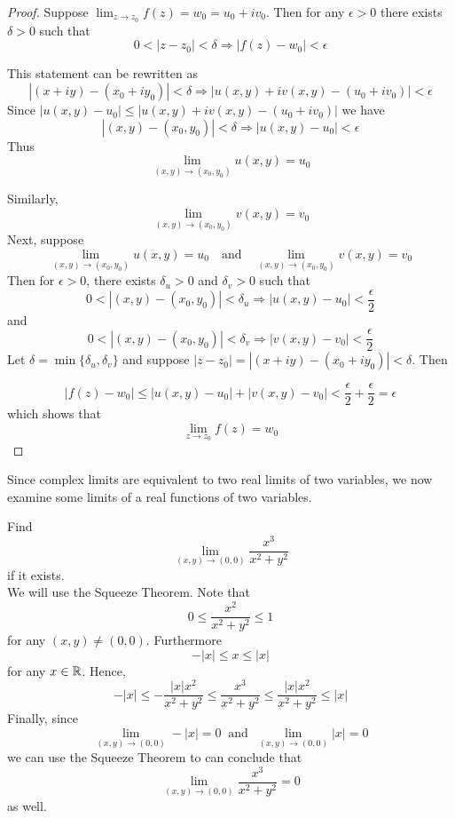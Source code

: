 \documentclass[handout]{ximera}
\begin{document}
\begin{proof} %
Suppose $\lim_{z \to z_0} f(z) = w_0 = u_0 + iv_0$.
Then for any $\epsilon > 0$ there exists $\delta > 0$ such that
\[
0< |z-z_0| < \delta \Rightarrow |f(z) - w_0| < \epsilon
\]


This statement can be rewritten as
\[
|(x+iy)-(x_0+i y_0)| < \delta \Rightarrow |u(x,y) + iv(x,y) - (u_0 + iv_0)|< \epsilon
\]
Since $|u(x,y) - u_0| \leq |u(x,y) + iv(x,y) - (u_0 + iv_0)|$
we have
\[
|(x,y)-(x_0, y_0)| < \delta \Rightarrow |u(x,y)  - u_0 |< \epsilon
\]
Thus
\[
\lim_{(x,y) \to (x_0, y_0)} u(x,y) =  u_0 
\]
 


Similarly,
\[
\lim_{(x,y) \to (x_0, y_0)} v(x,y) =  v_0 
\]
Next, suppose
\[
\lim_{(x,y) \to (x_0, y_0)} u(x,y) =  u_0  \quad \mbox{and} \quad \lim_{(x,y) \to (x_0, y_0)} v(x,y) =  v_0 
\]
Then for $\epsilon > 0$, there exists $\delta_u > 0$ and $\delta_v > 0$ such that
\[
0<|(x,y)-(x_0, y_0)| < \delta_u \Rightarrow |u(x,y)  - u_0 |< \frac{\epsilon}{2}
\]
and
\[
0<|(x,y)-(x_0, y_0)| < \delta_v \Rightarrow |v(x,y)  - v_0 |< \frac{\epsilon}{2}
\]
Let $\delta = \min\{\delta_u, \delta_v\}$ and suppose $|z-z_0| = |(x+iy) - (x_0 + iy_0)| <  \delta$. Then 


\[
|f(z) - w_0| \leq  |u(x,y)  - u_0 | + |v(x,y)  - v_0 | < \frac{\epsilon}{2}+ \frac{\epsilon}{2} = \epsilon
\]
which shows that
\[
\lim_{z \to z_0} f(z) = w_0
\]
\end{proof}

Since complex limits are equivalent to two real limits of two variables, we now examine some limits of a real functions of two variables.

\begin{example}[example 2]
Find
\[
\lim_{(x,y) \to (0,0)} \frac{x^3}{x^2 + y^2}
\]
if it exists.\\
We will use the Squeeze Theorem.  
Note that 
\[
0 \leq \frac{x^2}{x^2 + y^2} \leq 1
\]
for any $(x,y) \neq (0,0)$. Furthermore
\[
-|x| \leq x \leq |x|
\]
for any $x \in \mathbb R$. Hence,
\[
-|x| \leq - \frac{|x|x^2}{x^2 + y^2}\leq \frac{x^3}{x^2 + y^2} \leq  \frac{|x|x^2}{x^2 + y^2} \leq |x|
\]
Finally, since
\[
\lim_{(x,y) \to (0,0)} -|x| = 0 \;\; \mbox{and} \;\; \lim_{(x,y) \to (0,0)} |x| = 0
\]
we can use the Squeeze Theorem to can conclude that
\[
\lim_{(x,y) \to (0,0)} \frac{x^3}{x^2 + y^2} = 0
\]
as well.
\end{example}
\end{document}
